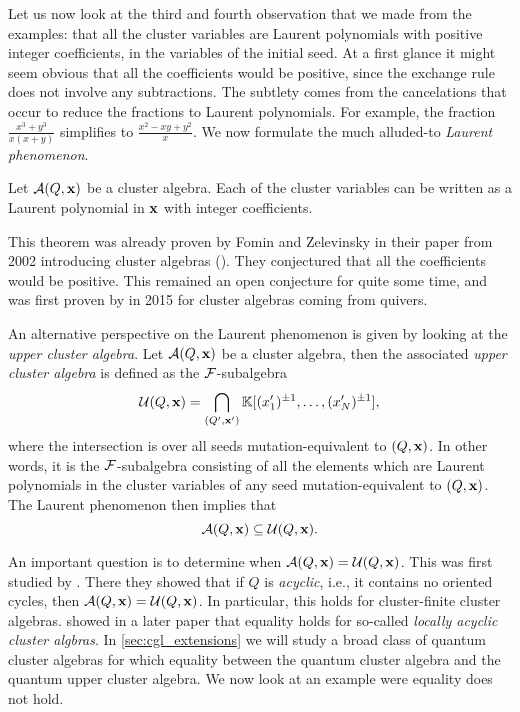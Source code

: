 \medskip

Let us now look at the third and fourth observation that we made from the examples:
that all the cluster variables are Laurent polynomials with positive integer
coefficients, in the variables of the initial seed. At a first glance it might seem
obvious that all the coefficients would be positive, since the exchange rule does not
involve any subtractions. The subtlety comes from the cancelations that occur to reduce
the fractions to Laurent polynomials. For example, the fraction $\frac{x^3 +
		y^3}{x(x+y)}$ simplifies to $\frac{x^2 - xy + y^2}{x}$. We now formulate the much
alluded-to \emph{Laurent phenomenon}.
\begin{theorem}\label{thm:laurent_phenomenon}

	Let $\mathcal{A} (Q, \mathbf{x})$ be a cluster algebra. Each of the cluster variables can be written
	as a Laurent polynomial in $\mathbf{x}$ with integer coefficients.
\end{theorem}
%
This theorem was already proven by Fomin and Zelevinsky in their paper from 2002
introducing cluster algebras (\cite[Theorem 3.1]{FominZelevinsky2002CAF}). They
conjectured that all the coefficients would be positive. This remained an open
conjecture for quite some time, and was first proven by
\textcite{LeeSchiffler2015PositivityCA} in 2015 for cluster algebras coming from
quivers.

An alternative perspective on the Laurent phenomenon is given by looking at the
\emph{upper cluster algebra}. Let $\mathcal{A}(Q, \mathbf{x})$ be a
cluster algebra, then the associated \emph{upper cluster algebra} is defined as the
$\mathcal{F}$-subalgebra
\begin{equation*}
	\mathcal{U}(Q, \mathbf{x}) = \bigcap_{(Q', \mathbf{x}')} \mathbb{K}[(x_1')^{\pm 1}, \dots, (x'_N)^{\pm 1}],
\end{equation*}
%
where the intersection is over all seeds mutation-equivalent to $(Q, \mathbf{x})$. In other
words, it is the $\mathcal{F}$-subalgebra consisting of all the elements which are Laurent
polynomials in the cluster variables of any seed mutation-equivalent to $(Q, \mathbf{x})$. The
Laurent phenomenon then implies that
\begin{equation*}
	\mathcal{A}(Q, \mathbf{x}) \subseteq \mathcal{U}(Q, \mathbf{x}).
\end{equation*}

An important question is to determine when $\mathcal{A}(Q, \mathbf{x}) = \mathcal{U}(Q, \mathbf{x})$. This was
first studied by \textcite{BerensteinFominZelevinsky2005CA3UpperBoundsDBC}. There they
showed that if $Q$ is \emph{acyclic}, i.e., it contains no
oriented cycles, then $\mathcal{A}(Q, \mathbf{x}) = \mathcal{U}(Q, \mathbf{x})$. In particular, this holds for
cluster-finite cluster algebras. \Textcite{Muller2013LocallyAcyclicCA} showed in a
later paper that equality holds for so-called \emph{locally acyclic cluster
	algbras}. In \cref{sec:cgl_extensions} we will
study a broad class of quantum cluster algebras for which equality between the quantum
cluster algebra and the quantum upper cluster algebra. We now look at an example were
equality does not hold.

